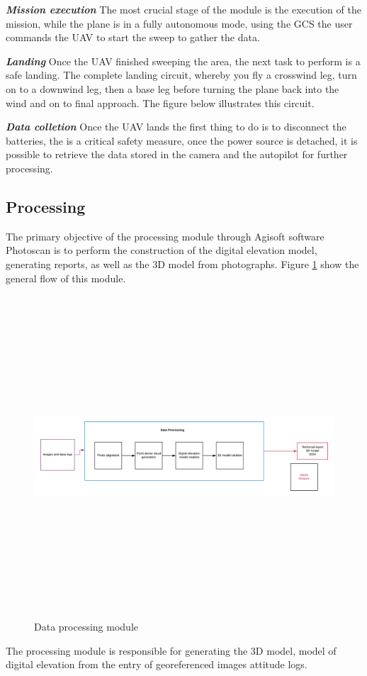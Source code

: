 \textit{\textbf{Mission execution}} \newline
The most crucial stage of the module is the execution of the mission, while the plane is in a fully autonomous mode, using the GCS the user commands the UAV to start the sweep to gather the data.

\textit{\textbf{Landing}} \newline
Once the UAV finished sweeping the area, the next task to perform is a safe landing. The complete landing circuit, whereby you fly a crosswind leg, turn on to a downwind leg, then a base leg before turning the plane back into the wind and on to final approach. The figure below illustrates this circuit.

\textit{\textbf{Data colletion}} \newline
Once the UAV lands the first thing to do is to disconnect the batteries, the is a critical safety measure, once the power source is detached, it is possible to retrieve the data stored in the camera and the autopilot for further processing. 

\subsection{Processing}
The primary objective of the processing module through Agisoft software
Photoscan is to perform the construction of the digital elevation model, generating reports, as well as the 3D model from photographs. Figure \ref{fig:DataProcessing} show the general flow of this module.
\begin{figure}[H]
\centering
\includegraphics[width=12cm,height=12cm,keepaspectratio]{imagenes/DataProcessing.png}
\caption{Data processing module}
\label{fig:DataProcessing}
\end{figure}
The processing module is responsible for generating the 3D model, model of digital elevation from the entry of georeferenced images attitude logs.

